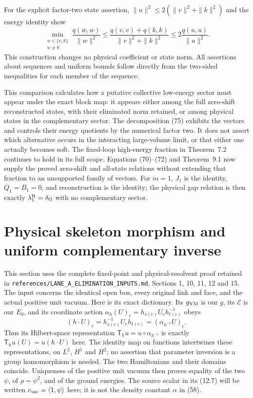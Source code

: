 \documentclass[11pt]{article}
\begin{document}
For the explicit factor-two state assertion,
$\|u\|^2\leq2(\|v\|^2+\|k\|^2)$ and the energy identity show
\[
 \min_{\substack{w\in\{v,k\}\\w\ne0}}
       \frac{q(w,w)}{\|w\|^2}
 \leq\frac{q(v,v)+q(k,k)}{\|v\|^2+\|k\|^2}
 \leq2\frac{q(u,u)}{\|u\|^2}.
\]
This construction changes no physical coefficient or state norm.
All assertions about sequences and uniform bounds follow directly
from the two-sided inequalities for each member of the sequence.



This comparison calculates how a putative collective low-energy sector
must appear under the exact block map: it appears either among the
full zero-shift reconstructed states, with their eliminated norm
retained, or among physical states in the complementary sector.
The decomposition (75) exhibits the vectors
and controls their energy quotients by the numerical factor two.
It does not assert which alternative occurs in the interacting
large-volume limit, or that either one actually becomes soft.
The fixed-loop high-energy fraction in Theorem~7.2
continues to hold in its full scope. Equations
(70)--(72) and
Theorem~9.1 now supply the proved zero-shift and
all-state relations without extending that fraction to an unsupported
family of vectors. For $m=1$, $J_1$ is the identity, $Q_1=B_1=0$,
and reconstruction is the identity; the physical gap relation is then
exactly $\lambda_1^{\rm R}=\delta_{\rm G}$ with no complementary sector.

\section{Physical skeleton morphism and uniform complementary inverse}
\label{sec:uniforminverse}

This section uses the complete fixed-point and physical-resolvent proof
retained in \nolinkurl{references/LANE_A_ELIMINATION_INPUTS.md},
Sections 1, 10, 11, 12 and 15. The input concerns the identical open
box, every original link and face, and the actual positive unit vacuum.
Here is its exact dictionary. Its $g_{\rm YM}$ is our $g$, its
$\mathcal E$ is our $E_0$, and its coordinate action
$\alpha_h(U)_e=h_{s(e)}U_eh_{t(e)}^{-1}$ obeys
\[
 (h\cdot U)_e=h_{s(e)}^{-1}U_eh_{t(e)}
                  =(\alpha_{h^{-1}}U)_e.
\]
Thus its Hilbert-space representation
$\mathsf T_hu=u\circ\alpha_{h^{-1}}$ is exactly
$\mathsf T_hu(U)=u(h\cdot U)$ here. The identity map on functions
intertwines these representations, on $L^2$, $H^1$ and $H^2$;
no assertion that parameter inversion is a group homomorphism is needed.
The two Hamiltonians and their domains coincide. Uniqueness of the
positive unit vacuum then proves equality of the two $\psi$, of
$\rho=\psi^2$, and of the ground energies. The source scalar in its
(12.7) will be written $c_{\rm vac}=\langle1,\psi\rangle$ here;
it is not the density constant $\alpha$ in (58).
\end{document}
